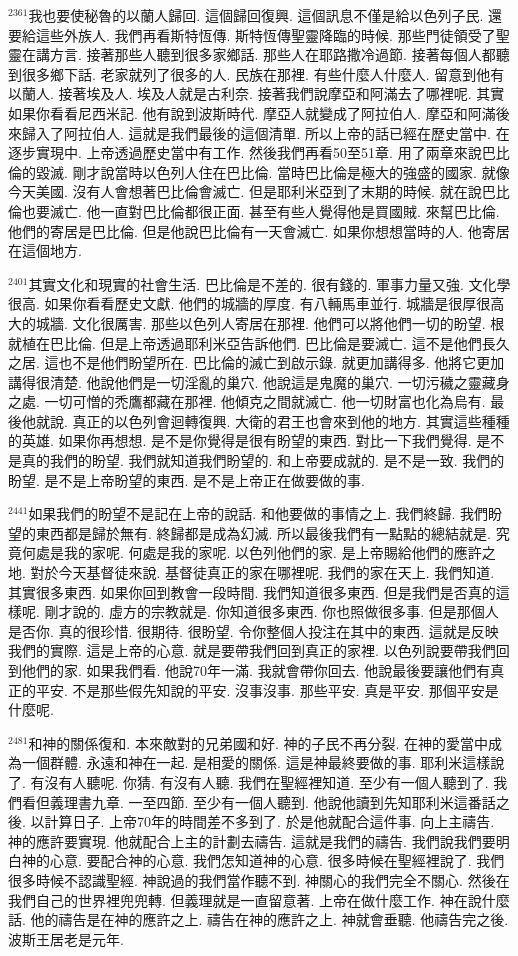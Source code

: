 \documentclass{book}
\begin{document}
$^{2361}$我也要使秘魯的以蘭人歸回.
這個歸回復興.
這個訊息不僅是給以色列子民.
還要給這些外族人.
我們再看斯特恆傳.
斯特恆傳聖靈降臨的時候.
那些門徒領受了聖靈在講方言.
接著那些人聽到很多家鄉話.
那些人在耶路撒冷過節.
接著每個人都聽到很多鄉下話.
老家就列了很多的人.
民族在那裡.
有些什麼人什麼人.
留意到他有以蘭人.
接著埃及人.
埃及人就是古利奈.
接著我們說摩亞和阿滿去了哪裡呢.
其實如果你看看尼西米記.
他有說到波斯時代.
摩亞人就變成了阿拉伯人.
摩亞和阿滿後來歸入了阿拉伯人.
這就是我們最後的這個清單.
所以上帝的話已經在歷史當中.
在逐步實現中.
上帝透過歷史當中有工作.
然後我們再看50至51章.
用了兩章來說巴比倫的毀滅.
剛才說當時以色列人住在巴比倫.
當時巴比倫是極大的強盛的國家.
就像今天美國.
沒有人會想著巴比倫會滅亡.
但是耶利米亞到了末期的時候.
就在說巴比倫也要滅亡.
他一直對巴比倫都很正面.
甚至有些人覺得他是買國賊.
來幫巴比倫.
他們的寄居是巴比倫.
但是他說巴比倫有一天會滅亡.
如果你想想當時的人.
他寄居在這個地方.

$^{2401}$其實文化和現實的社會生活.
巴比倫是不差的.
很有錢的.
軍事力量又強.
文化學很高.
如果你看看歷史文獻.
他們的城牆的厚度.
有八輛馬車並行.
城牆是很厚很高大的城牆.
文化很厲害.
那些以色列人寄居在那裡.
他們可以將他們一切的盼望.
根就植在巴比倫.
但是上帝透過耶利米亞告訴他們.
巴比倫是要滅亡.
這不是他們長久之居.
這也不是他們盼望所在.
巴比倫的滅亡到啟示錄.
就更加講得多.
他將它更加講得很清楚.
他說他們是一切淫亂的巢穴.
他說這是鬼魔的巢穴.
一切污穢之靈藏身之處.
一切可憎的禿鷹都藏在那裡.
他傾克之間就滅亡.
他一切財富也化為烏有.
最後他就說.
真正的以色列會迴轉復興.
大衛的君王也會來到他的地方.
其實這些種種的英雄.
如果你再想想.
是不是你覺得是很有盼望的東西.
對比一下我們覺得.
是不是真的我們的盼望.
我們就知道我們盼望的.
和上帝要成就的.
是不是一致.
我們的盼望.
是不是上帝盼望的東西.
是不是上帝正在做要做的事.

$^{2441}$如果我們的盼望不是記在上帝的說話.
和他要做的事情之上.
我們終歸.
我們盼望的東西都是歸於無有.
終歸都是成為幻滅.
所以最後我們有一點點的總結就是.
究竟何處是我的家呢.
何處是我的家呢.
以色列他們的家.
是上帝賜給他們的應許之地.
對於今天基督徒來說.
基督徒真正的家在哪裡呢.
我們的家在天上.
我們知道.
其實很多東西.
如果你回到教會一段時間.
我們知道很多東西.
但是我們是否真的這樣呢.
剛才說的.
虛方的宗教就是.
你知道很多東西.
你也照做很多事.
但是那個人是否你.
真的很珍惜.
很期待.
很盼望.
令你整個人投注在其中的東西.
這就是反映我們的實際.
這是上帝的心意.
就是要帶我們回到真正的家裡.
以色列說要帶我們回到他們的家.
如果我們看.
他說70年一滿.
我就會帶你回去.
他說最後要讓他們有真正的平安.
不是那些假先知說的平安.
沒事沒事.
那些平安.
真是平安.
那個平安是什麼呢.

$^{2481}$和神的關係復和.
本來敵對的兄弟國和好.
神的子民不再分裂.
在神的愛當中成為一個群體.
永遠和神在一起.
是相愛的關係.
這是神最終要做的事.
耶利米這樣說了.
有沒有人聽呢.
你猜.
有沒有人聽.
我們在聖經裡知道.
至少有一個人聽到了.
我們看但義理書九章.
一至四節.
至少有一個人聽到.
他說他讀到先知耶利米這番話之後.
以計算日子.
上帝70年的時間差不多到了.
於是他就配合這件事.
向上主禱告.
神的應許要實現.
他就配合上主的計劃去禱告.
這就是我們的禱告.
我們說我們要明白神的心意.
要配合神的心意.
我們怎知道神的心意.
很多時候在聖經裡說了.
我們很多時候不認識聖經.
神說過的我們當作聽不到.
神關心的我們完全不關心.
然後在我們自己的世界裡兜兜轉.
但義理就是一直留意著.
上帝在做什麼工作.
神在說什麼話.
他的禱告是在神的應許之上.
禱告在神的應許之上.
神就會垂聽.
他禱告完之後.
波斯王居老是元年.
\end{document}
